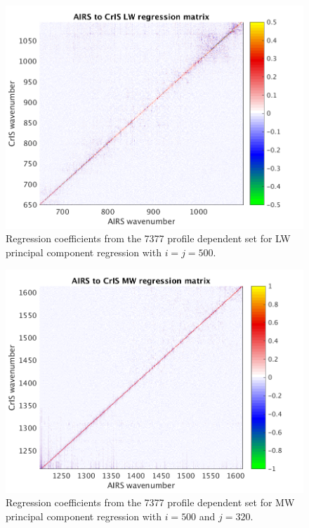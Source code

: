 \documentclass[journal]{IEEEtran}
\begin{document}
\begin{figure} %
  \centering
  \includegraphics[width=\linewidth]{figures/LW_pc_regr_mat.png}
  \caption{Regression coefficients from the 7377 profile dependent
    set for LW principal component regression with $i = j = 500$.}
  \label{dreg7}
\end{figure}

\begin{figure} %
  \centering
  \includegraphics[width=\linewidth]{figures/MW_pc_regr_mat.png}
  \caption{Regression coefficients from the 7377 profile dependent
    set for MW principal component regression with $i = 500$ and $j
    = 320$.}
  \label{dreg8}
\end{figure}
\end{document}
